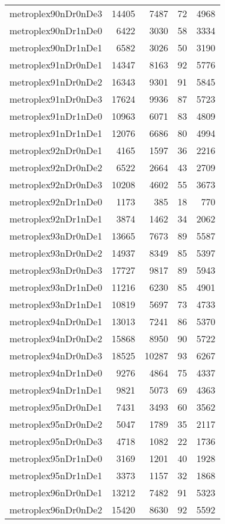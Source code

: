 \begin{longtable}{lrrrr}
metroplex90nDr0nDe3 & 14405 & 7487 & 72 & 4968 \\
metroplex90nDr1nDe0 & 6422 & 3030 & 58 & 3334 \\
metroplex90nDr1nDe1 & 6582 & 3026 & 50 & 3190 \\
metroplex91nDr0nDe1 & 14347 & 8163 & 92 & 5776 \\
metroplex91nDr0nDe2 & 16343 & 9301 & 91 & 5845 \\
metroplex91nDr0nDe3 & 17624 & 9936 & 87 & 5723 \\
metroplex91nDr1nDe0 & 10963 & 6071 & 83 & 4809 \\
metroplex91nDr1nDe1 & 12076 & 6686 & 80 & 4994 \\
metroplex92nDr0nDe1 & 4165 & 1597 & 36 & 2216 \\
metroplex92nDr0nDe2 & 6522 & 2664 & 43 & 2709 \\
metroplex92nDr0nDe3 & 10208 & 4602 & 55 & 3673 \\
metroplex92nDr1nDe0 & 1173 & 385 & 18 & 770 \\
metroplex92nDr1nDe1 & 3874 & 1462 & 34 & 2062 \\
metroplex93nDr0nDe1 & 13665 & 7673 & 89 & 5587 \\
metroplex93nDr0nDe2 & 14937 & 8349 & 85 & 5397 \\
metroplex93nDr0nDe3 & 17727 & 9817 & 89 & 5943 \\
metroplex93nDr1nDe0 & 11216 & 6230 & 85 & 4901 \\
metroplex93nDr1nDe1 & 10819 & 5697 & 73 & 4733 \\
metroplex94nDr0nDe1 & 13013 & 7241 & 86 & 5370 \\
metroplex94nDr0nDe2 & 15868 & 8950 & 90 & 5722 \\
metroplex94nDr0nDe3 & 18525 & 10287 & 93 & 6267 \\
metroplex94nDr1nDe0 & 9276 & 4864 & 75 & 4337 \\
metroplex94nDr1nDe1 & 9821 & 5073 & 69 & 4363 \\
metroplex95nDr0nDe1 & 7431 & 3493 & 60 & 3562 \\
metroplex95nDr0nDe2 & 5047 & 1789 & 35 & 2117 \\
metroplex95nDr0nDe3 & 4718 & 1082 & 22 & 1736 \\
metroplex95nDr1nDe0 & 3169 & 1201 & 40 & 1928 \\
metroplex95nDr1nDe1 & 3373 & 1157 & 32 & 1868 \\
metroplex96nDr0nDe1 & 13212 & 7482 & 91 & 5323 \\
metroplex96nDr0nDe2 & 15420 & 8630 & 92 & 5592 \\

\end{longtable}
